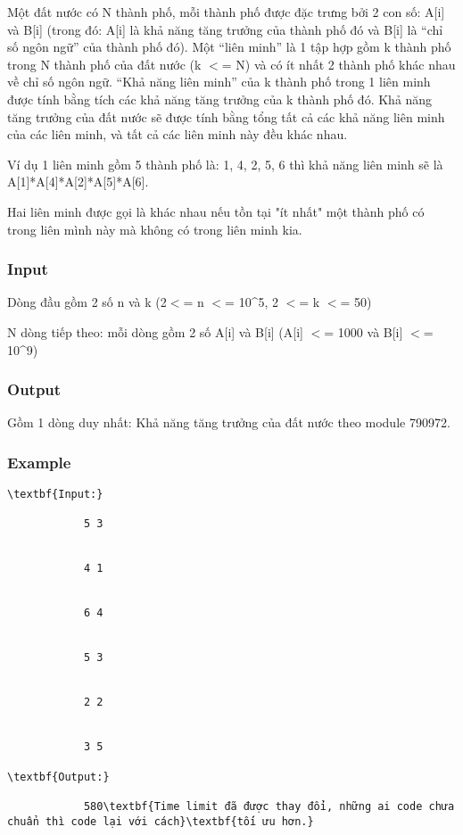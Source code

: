 



    Một đất nước có N thành phố, mỗi thành phố được đặc trưng bởi 2 con số: A[i] và B[i] (trong đó: A[i] là khả năng tăng trưởng của thành phố đó và B[i] là “chỉ số ngôn ngữ” của thành phố đó). Một “liên minh” là 1 tập hợp gồm k thành phố trong N thành phố của đất nước (k $<$= N) và có ít nhất 2 thành phố khác nhau về chỉ số ngôn ngữ. “Khả năng liên minh” của k thành phố trong 1 liên minh được tính bằng tích các khả năng tăng trưởng của k thành phố đó. Khả năng tăng trưởng của đất nước sẽ được tính bằng tổng tất cả các khả năng liên minh của các liên minh, và tất cả các liên minh này đều khác nhau.   



    Ví dụ 1 liên minh gồm 5 thành phố là: 1, 4, 2, 5, 6 thì khả năng liên minh sẽ là A[1]*A[4]*A[2]*A[5]*A[6].   



    Hai liên minh được gọi là khác nhau nếu tồn tại "ít nhất" một thành phố có trong liên mình này mà không có trong liên minh kia.   

\subsubsection{   Input  }



    Dòng đầu gồm 2 số n và k (2$<$= n $<$= 10\textasciicircum5, 2 $<$= k $<$= 50)   



    N dòng tiếp theo: mỗi dòng gồm 2 số A[i] và B[i] (A[i] $<$= 1000 và B[i] $<$= 10\textasciicircum9)   

\subsubsection{   Output  }

    Gồm 1 dòng duy nhất: Khả năng tăng trưởng của đất nước theo module 790972.   

\subsubsection{    Example   }
\begin{verbatim}
\textbf{Input:}

            5 3


            4 1


            6 4


            5 3


            2 2


            3 5

\textbf{Output:}

            580\textbf{Time limit đã được thay đổi, những ai code chưa chuẩn thì code lại với cách}\textbf{tối ưu hơn.}\end{verbatim}